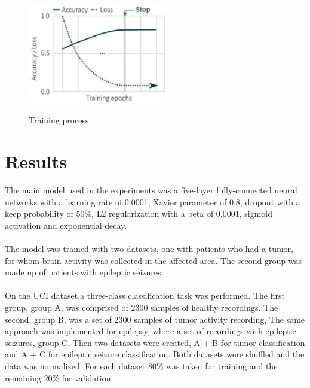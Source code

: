 \documentclass{llncs}       %
\begin{document}
\paragraph{}

\begin{figure}[h]
\centering
\includegraphics[width=6.08cm,height=5.11cm]{media/training-pro.eps}
\caption{ Training process}
\end{figure}

\paragraph{}
\section{Results}
\label{sec:4}
 The main model used in the experiments was a five-layer fully-connected neural networks with a learning rate of 0.0001, Xavier parameter of 0.8, dropout with a keep probability of 50\%, L2 regularization with a beta of 0.0001, sigmoid activation and exponential decay. 

\paragraph{}
The model was trained with two datasets, one with patients who had a tumor, for whom brain activity was collected in the affected area. The second group was made up of  patients with epileptic seizures.
\paragraph{}
On the UCI dataset,a three-class classification task was performed. The first group, group A, was comprised of  2300 samples of healthy recordings. The second, group B, was a set of 2300 samples of tumor activity recording, The same approach was implemented for epilepsy,  where a set of recordings with epileptic seizures, group  C. Then two datasets were created, A + B for tumor classification and A + C for epileptic seizure classification. Both datasets were shuffled and the data was normalized. For each dataset 80\% was taken for training and the remaining 20\% for validation. 
\end{document}
